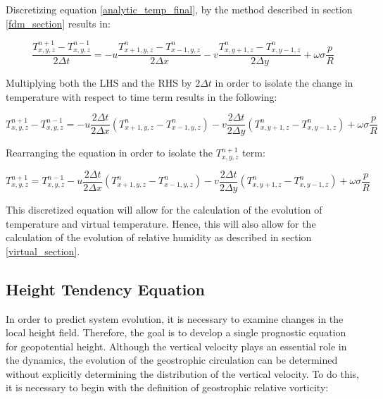 Discretizing equation \ref{analytic_temp_final}, by the method described in section \ref{fdm_section} results in:

\begin{equation}
    \frac{T^{n + 1}_{x, y, z} - T^{n - 1}_{x, y, z}}{2 \Delta t} = -u \frac{T^{n}_{x+1, y, z} - T^{n}_{x-1, y, z}}{2 \Delta x} - v \frac{T^{n}_{x, y+1, z} - T^{n}_{x, y-1, z}}{2 \Delta y} + \omega \sigma \frac{p}{R}
\end{equation}

Multiplying both the LHS and the RHS by $2 \Delta t$ in order to isolate the change in temperature with respect to time term results in the following:

\begin{equation}
     T^{n + 1}_{x, y, z} - T^{n - 1}_{x, y, z} = - u \frac{2 \Delta t}{2 \Delta x} (T^{n}_{x+1, y, z} - T^{n}_{x-1, y, z}) - v \frac{2 \Delta t}{2 \Delta y} (T^{n}_{x, y+1, z} - T^{n}_{x, y-1, z}) + \omega \sigma \frac{p}{R}
\end{equation}

Rearranging the equation in order to isolate the $T^{n + 1}_{x, y, z}$ term: 

\begin{equation}
     T^{n + 1}_{x, y, z} = T^{n - 1}_{x, y, z} - u \frac{2 \Delta t}{2 \Delta x} (T^{n}_{x+1, y, z} - T^{n}_{x-1, y, z}) - v \frac{2 \Delta t}{2 \Delta y} (T^{n}_{x, y+1, z} - T^{n}_{x, y-1, z}) + \omega \sigma \frac{p}{R}
\end{equation}

This discretized equation will allow for the calculation of the evolution of temperature and virtual temperature. Hence, this will also allow for the calculation of the evolution of relative humidity as described in section \ref{virtual_section}.

\subsection{Height Tendency Equation}
In order to predict system evolution, it is necessary to examine changes in the local height field. Therefore, the goal is to develop a single prognostic equation for geopotential height. Although the vertical velocity plays an essential role in the dynamics, the evolution of the geostrophic circulation can be determined without explicitly determining the distribution of the vertical velocity\cite{eq_describe}. To do this, it is necessary to begin with the definition of geostrophic relative vorticity:

